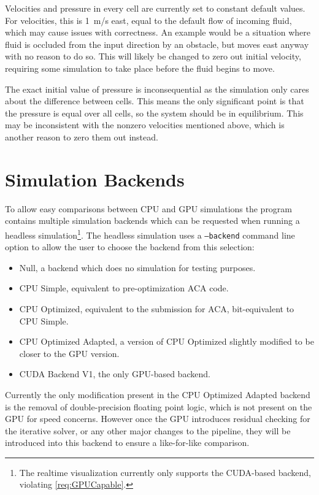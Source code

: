 Velocities and pressure in every cell are currently set to constant default values.
For velocities, this is \SI{1}{m/s} east, equal to the default flow of incoming fluid, which may cause issues with correctness.
An example would be a situation where fluid is occluded from the input direction by an obstacle, but moves east anyway with no reason to do so.
This will likely be changed to zero out initial velocity, requiring some simulation to take place before the fluid begins to move.

The exact initial value of pressure is inconsequential as the simulation only cares about the difference between cells.
This means the only significant point is that the pressure is equal over all cells, so the system should be in equilibrium.
This may be inconsistent with the nonzero velocities mentioned above, which is another reason to zero them out instead.




\section{Simulation Backends}
To allow easy comparisons between CPU and GPU simulations the program contains multiple simulation backends which can be requested when running a headless simulation\footnote{The realtime visualization currently only supports the CUDA-based backend, violating \cref{req:GPUCapable}.}.
The headless simulation uses a \texttt{--backend} command line option to allow the user to choose the backend from this selection:\label{sec:DesignBackends}
\begin{itemize}
    \item Null, a backend which does no simulation for testing purposes.
    \item CPU Simple, equivalent to pre-optimization ACA code.
    \item CPU Optimized, equivalent to the submission for ACA, bit-equivalent to CPU Simple.
    \item CPU Optimized Adapted, a version of CPU Optimized slightly modified to be closer to the GPU version.
    \item CUDA Backend V1, the only GPU-based backend.
\end{itemize}

Currently the only modification present in the CPU Optimized Adapted backend is the removal of double-precision floating point logic, which is not present on the GPU for speed concerns.
However once the GPU introduces residual checking for the iterative solver, or any other major changes to the pipeline, they will be introduced into this backend to ensure a like-for-like comparison.

